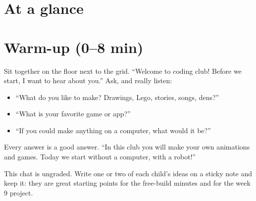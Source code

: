 \section{At a glance}
\begin{timeplan}
\end{timeplan}

\section{Warm-up (0--8 min)}
\begin{teacherscript}
Sit together on the floor next to the grid. \enquote{Welcome to coding club! Before we start, I want to hear about you.} Ask, and really listen:
\begin{itemize}[leftmargin=1.2em,itemsep=1pt]
  \item \enquote{What do you like to make? Drawings, Lego, stories, songs, dens?}
  \item \enquote{What is your favorite game or app?}
  \item \enquote{If you could make anything on a computer, what would it be?}
\end{itemize}
Every answer is a good answer. \enquote{In this club you will make your own animations and games. Today we start without a computer, with a robot!}
\end{teacherscript}

\begin{teachernote}
This chat is ungraded. Write one or two of each child's ideas on a sticky note and keep it: they are great starting points for the free-build minutes and for the week 9 project.
\end{teachernote}

